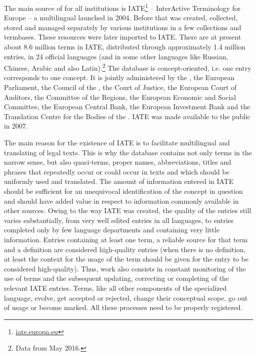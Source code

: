 \documentclass[output=paper]{langsci/langscibook}
\begin{document}
The main source of  for all  institutions is IATE\footnote{\url{iate.europa.eu}} – InterActive Terminology for Europe – a multilingual  launched in 2004. Before that   was created, collected, stored and managed separately by various institutions in a few collections and termbases. These resources were later imported to IATE. There are at present about 8.6 million terms in IATE, distributed through approximately 1.4 million entries, in 24 official  languages (and in some other languages like Russian, Chinese, Arabic and also Latin).\footnote{Data from May 2016.} The database is concept-oriented, i.e. one entry corresponds to one concept. It is jointly administered by the , the European Parliament, the Council of the , the Court of Justice, the European Court of Auditors, the Committee of the Regions, the European Economic and Social Committee, the European Central Bank, the European Investment Bank and the Translation Centre for the Bodies of the . IATE was made available to the public in 2007.

The main reason for the existence of IATE is to facilitate multilingual  and translating of  legal texts. This is why the database contains not only terms in the narrow sense, but also quasi-terms, proper names, abbreviations, titles and phrases that repeatedly occur or could occur in  texts and which should be uniformly used and translated. The amount of information entered in IATE should be sufficient for an unequivocal identification of the concept in question and should have added value in respect to information commonly available in other sources. Owing to the way IATE was created, the quality of the entries still varies substantially, from very well edited entries in all languages, to entries completed only by few language departments and containing very little information. Entries containing at least one term, a reliable source for that term and a definition are considered high-quality entries (when there is no definition, at least the context for the usage of the term should be given for the entry to be considered high-quality). Thus,  work also consists in constant monitoring of the use of terms and the subsequent updating, correcting or completing of the relevant IATE entries. Terms, like all other components of the specialized language, evolve, get accepted or rejected, change their conceptual scope, go out of usage or become marked. All these processes need to be properly registered.
\end{document}
